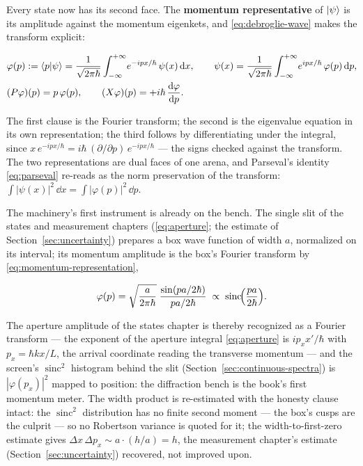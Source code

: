 Every state now has its second face. The \textbf{momentum representative} of $\ket{\psi}$ is its amplitude against the momentum eigenkets, and \eqref{eq:debroglie-wave} makes the transform explicit:
\begin{linenomath}
    \begin{equation}
        \begin{split}
            &\varphi(p) := \braket{p|\psi} = \frac{1}{\sqrt{2\pi\hbar}}\int_{-\infty}^{+\infty}\!e^{-ipx/\hbar}\,\psi(x)\,\mathrm{d} x, \qquad \psi(x) = \frac{1}{\sqrt{2\pi\hbar}}\int_{-\infty}^{+\infty}\!e^{ipx/\hbar}\,\varphi(p)\,\mathrm{d} p, \\
            &(P\varphi)(p) = p\,\varphi(p), \qquad (X\varphi)(p) = +i\hbar\,\frac{\mathrm{d}\varphi}{\mathrm{d} p} .
        \end{split}
        \label{eq:momentum-representation}
    \end{equation}
\end{linenomath}
The first clause is the Fourier transform; the second is the eigenvalue equation in its own representation; the third follows by differentiating under the integral, since $x\,e^{-ipx/\hbar} = i\hbar\,(\partial/\partial p)\,e^{-ipx/\hbar}$ --- the signs checked against the transform. The two representations are dual faces of one arena, and Parseval's identity \eqref{eq:parseval} re-reads as the norm preservation of the transform: $\int\!|\psi(x)|^2\,\dd x = \int\!|\varphi(p)|^2\,\dd p$.

The machinery's first instrument is already on the bench. The single slit of the states and measurement chapters (\eqref{eq:aperture}; the estimate of Section~\ref{sec:uncertainty}) prepares a box wave function of width $a$, normalized on its interval; its momentum amplitude is the box's Fourier transform by \eqref{eq:momentum-representation},
\begin{linenomath}
    \begin{equation*}
        \varphi(p) = \sqrt{\frac{a}{2\pi\hbar}}\;\frac{\sin(pa/2\hbar)}{pa/2\hbar} \;\propto\; \operatorname{sinc}\!\Bigl(\frac{pa}{2\hbar}\Bigr) .
    \end{equation*}
\end{linenomath}
The aperture amplitude of the states chapter is thereby recognized as a Fourier transform --- the exponent of the aperture integral \eqref{eq:aperture} is $ip_xx'/\hbar$ with $p_x = \hbar kx/L$, the arrival coordinate reading the transverse momentum --- and the screen's $\operatorname{sinc}^2$ histogram behind the slit (Section~\ref{sec:continuous-spectra}) is $|\varphi(p_x)|^2$ mapped to position: the diffraction bench is the book's first momentum meter. The width product is re-estimated with the honesty clause intact: the $\operatorname{sinc}^2$ distribution has no finite second moment --- the box's cusps are the culprit --- so no Robertson variance is quoted for it; the width-to-first-zero estimate gives $\Delta x\,\Delta p_x \sim a\cdot(h/a) = h$, the measurement chapter's estimate (Section~\ref{sec:uncertainty}) recovered, not improved upon.

